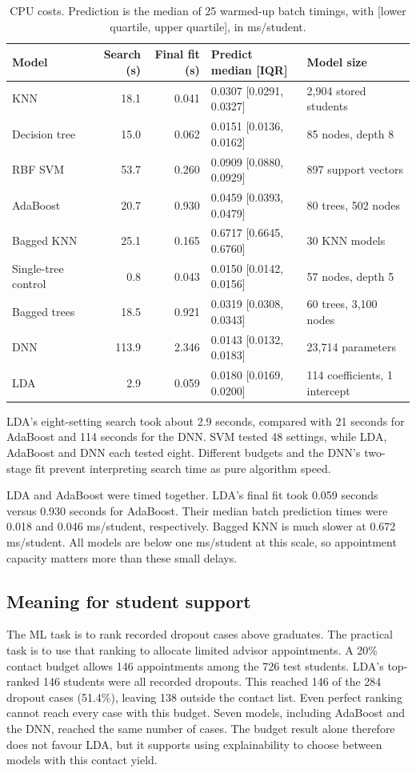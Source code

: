 \begin{table}[H]
\centering\small
\setlength{\tabcolsep}{3pt}
\caption[Model size and computation time]{CPU costs. Prediction is the median of
25 warmed-up batch timings, with [lower quartile, upper quartile], in ms/student.}
\label{tab:costs}
\begin{tabularx}{\linewidth}{@{}lrrlX@{}}
\toprule
Model & Search (s) & Final fit (s) & Predict median [IQR] & Model size \\
\midrule
KNN & 18.1 & 0.041 & 0.0307 [0.0291, 0.0327] & 2,904 stored students \\
Decision tree & 15.0 & 0.062 & 0.0151 [0.0136, 0.0162] & 85 nodes, depth 8 \\
RBF SVM & 53.7 & 0.260 & 0.0909 [0.0880, 0.0929] & 897 support vectors \\
AdaBoost & 20.7 & 0.930 & 0.0459 [0.0393, 0.0479] & 80 trees, 502 nodes \\
Bagged KNN & 25.1 & 0.165 & 0.6717 [0.6645, 0.6760] & 30 KNN models \\
Single-tree control & 0.8 & 0.043 & 0.0150 [0.0142, 0.0156] & 57 nodes, depth 5 \\
Bagged trees & 18.5 & 0.921 & 0.0319 [0.0308, 0.0343] & 60 trees, 3,100 nodes \\
DNN & 113.9 & 2.346 & 0.0143 [0.0132, 0.0183] & 23,714 parameters \\
LDA & 2.9 & 0.059 & 0.0180 [0.0169, 0.0200] & 114 coefficients, 1 intercept \\
\bottomrule
\end{tabularx}
\end{table}

LDA's eight-setting search took about 2.9 seconds, compared with 21 seconds
for AdaBoost and 114 seconds for the DNN. SVM tested 48 settings, while LDA,
AdaBoost and DNN each tested eight. Different budgets and the DNN's two-stage
fit prevent interpreting search time as pure algorithm speed.

LDA and AdaBoost were timed together. LDA's
final fit took 0.059 seconds versus 0.930 seconds for AdaBoost. Their median
batch prediction times were 0.018 and 0.046 ms/student, respectively.
Bagged KNN is much slower at 0.672 ms/student.
All models are below one ms/student at this scale, so appointment capacity
matters more than these small delays.

\subsection{Meaning for student support}
The ML task is to rank recorded dropout cases above graduates. The practical
task is to use that ranking to allocate limited advisor appointments.
A 20\% contact budget allows 146 appointments among the 726 test students.
LDA's top-ranked 146 students were all recorded dropouts. This reached
146 of the 284 dropout cases (51.4\%), leaving 138 outside the contact list.
Even perfect ranking cannot reach every case with this budget. Seven models,
including AdaBoost and the DNN, reached the same number of cases.
The budget result alone therefore does not favour LDA, but it supports using
explainability to choose between models with this contact yield.

